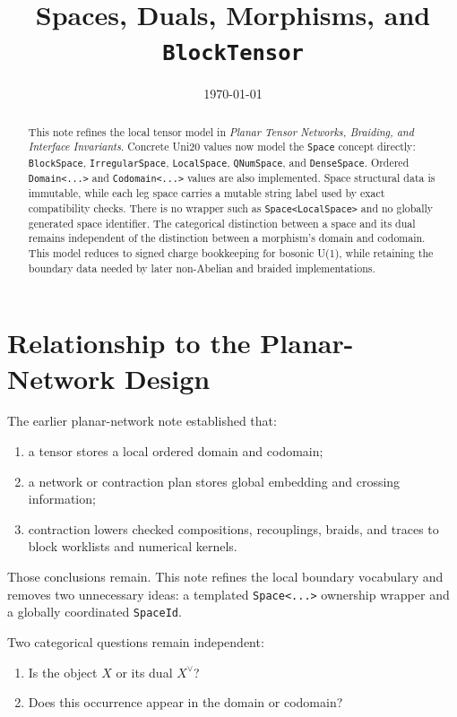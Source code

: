 \documentclass[11pt]{article}
\title{Spaces, Duals, Morphisms, and \texttt{BlockTensor}}
\author{}
\date{\today}
\newcommand{\dual}[1]{#1^{\vee}}
\begin{document}
\maketitle

\begin{abstract}
This note refines the local tensor model in
\emph{Planar Tensor Networks, Braiding, and Interface Invariants}.
Concrete Uni20 values now model the \texttt{Space} concept directly:
\texttt{BlockSpace}, \texttt{IrregularSpace}, \texttt{LocalSpace},
\texttt{QNumSpace}, and \texttt{DenseSpace}.  Ordered
\texttt{Domain<...>} and \texttt{Codomain<...>} values are also implemented.
Space structural data is immutable, while each leg space carries a mutable
string label used by exact compatibility checks.  There is no wrapper such as
\texttt{Space<LocalSpace>} and no globally generated space identifier.  The
categorical distinction between a space and its dual remains independent of
the distinction between a morphism's domain and codomain.  This model reduces
to signed charge bookkeeping for bosonic U(1), while retaining the boundary
data needed by later non-Abelian and braided implementations.
\end{abstract}

\tableofcontents

\section{Relationship to the Planar-Network Design}

The earlier planar-network note established that:

\begin{enumerate}[nosep]
  \item a tensor stores a local ordered domain and codomain;
  \item a network or contraction plan stores global embedding and
        crossing information;
  \item contraction lowers checked compositions, recouplings, braids,
        and traces to block worklists and numerical kernels.
\end{enumerate}

Those conclusions remain.  This note refines the local boundary
vocabulary and removes two unnecessary ideas: a templated
\texttt{Space<...>} ownership wrapper and a globally coordinated
\texttt{SpaceId}.

Two categorical questions remain independent:

\begin{enumerate}[nosep]
  \item Is the object \(X\) or its dual \(\dual{X}\)?
  \item Does this occurrence appear in the domain or codomain?
\end{enumerate}
\end{document}
